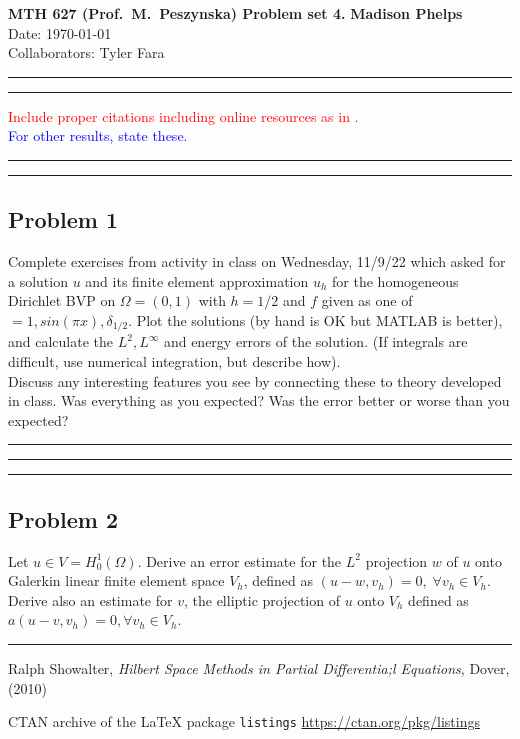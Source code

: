 \documentclass[12pt]{amsart}
\begin{document}
\noindent
\textbf{MTH 627 (Prof.~M.~Peszynska) Problem set 4. } \hfill \textbf{Madison Phelps}\\
\hfill Date: \today\\
Collaborators: Tyler Fara\\
\medskip
\hrule
\hrule
\medskip
\noindent
\textcolor{red}{Include  proper citations including online resources as in  \cite[Chap.I, Theorem 1.1]{Showalter}. 
} 
\\
\textcolor{blue}{For other results, state these.} 

\medskip
\hrule
\hrule
\medskip
\subsection*{Problem 1}
Complete exercises from activity in class on Wednesday, 11/9/22 which asked for a solution $u$ and its finite element approximation $u_h$ for the homogeneous Dirichlet BVP on  $\Omega=(0,1)$ with $h=1/2$ and $f$ given as one of $= 1,sin(\pi x), \delta_{1/2}$.  Plot the solutions (by hand is OK but MATLAB is better), and calculate the $L^2,L^{\infty}$ and energy errors of the solution. (If integrals are difficult, use numerical integration, but describe how). 
\\
Discuss any interesting features you see by connecting these to theory developed in class. Was everything as you expected?  Was the error better or worse than you expected? 
%
\\
\medskip
\hrule
\medskip
%

\medskip
\hrule
\hrule
\medskip
\subsection*{Problem 2}
Let $u \in V=H_0^1(\Omega)$. Derive an error estimate for the $L^2$ projection $w$ of $u$ onto Galerkin linear finite element space $V_h$, defined as $(u-w,v_h)=0,\; \forall v_h \in V_h$. 
\\
Derive also an estimate for $v$, the elliptic projection of $u$  onto $V_h$ defined as $a(u-v,v_h)=0, \forall v_h \in V_h$. 
\\
\medskip
\hrule
\medskip
%




\begin{thebibliography}{9}
 Ralph Showalter, \emph{Hilbert Space Methods in Partial Differentia;l Equations}, Dover, (2010)

 CTAN archive of the LaTeX package {\tt listings} \url{https://ctan.org/pkg/listings}
\end{thebibliography}
\end{document}
